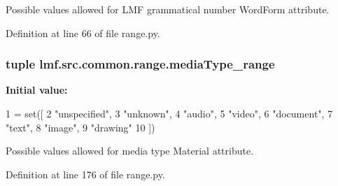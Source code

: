 Possible values allowed for L\+M\+F grammatical number Word\+Form attribute. 



Definition at line 66 of file range.\+py.

\hypertarget{namespacelmf_1_1src_1_1common_1_1range_a61963614ed4bb258825e4104a8b47014}{
\subsubsection[{media\+Type\+\_\+range}]{\setlength{\rightskip}{0pt plus 5cm}tuple lmf.\+src.\+common.\+range.\+media\+Type\+\_\+range}}\label{namespacelmf_1_1src_1_1common_1_1range_a61963614ed4bb258825e4104a8b47014}
{\bfseries Initial value\+:}
\begin{DoxyCode}
1 = set([
2     \textcolor{stringliteral}{"unspecified"},
3     \textcolor{stringliteral}{"unknown"},
4     \textcolor{stringliteral}{"audio"},
5     \textcolor{stringliteral}{"video"},
6     \textcolor{stringliteral}{"document"},
7     \textcolor{stringliteral}{"text"},
8     \textcolor{stringliteral}{"image"},
9     \textcolor{stringliteral}{"drawing"}
10 ])
\end{DoxyCode}


Possible values allowed for media type Material attribute. 



Definition at line 176 of file range.\+py.

